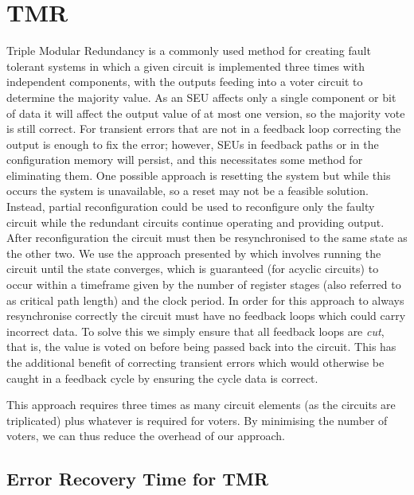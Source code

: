 \documentclass[12pt,final,oneside]{dwThesis} %
\begin{document}
   \section{\gls{TMR}
   }\label{secTMR} Triple Modular Redundancy is a
   commonly used method for creating fault tolerant systems in which a given
   circuit is implemented three times with independent components, with the
   outputs feeding into a voter circuit to determine the majority value. As an
   \gls{SEU} affects only a single component or bit of data it
   will affect the output value of at most one version, so the majority vote is
   still correct. For transient errors that are not in a feedback loop correcting
   the output is enough to fix the error; however, \glspl{SEU} in feedback paths
   or in the configuration memory will persist, and this necessitates some method
   for eliminating them. One possible approach is resetting the system but while
   this occurs the system is unavailable, so a reset may not be a feasible
   solution. Instead, partial reconfiguration could be used to reconfigure only
   the faulty circuit while the redundant circuits continue operating and
   providing output. After reconfiguration the circuit must then be resynchronised
   to the same state as the other two. We use the approach presented by
   \cite{DiesselChange} which involves running the circuit until the state
   converges, which is guaranteed (for acyclic circuits) to occur within a
   timeframe given by the number of register stages (also referred to as critical path length)
    and the clock period. In
   order for this approach to always resynchronise correctly the circuit must have
   no feedback loops which could carry incorrect data. To solve this we simply
   ensure that all feedback loops are \textit{cut}, that is, the value is voted on
   before being passed back into the circuit. This has the additional benefit of
   correcting transient errors which would otherwise be caught in a feedback cycle
   by ensuring the cycle data is correct.

   This approach requires three times as many circuit elements (as the circuits
   are triplicated) plus whatever is required for voters. By minimising the
   number of voters, we can thus reduce the overhead of our approach.

   \subsection{Error Recovery Time for \gls{TMR}}
\end{document}
